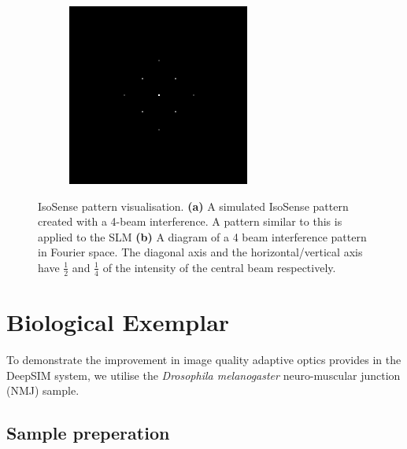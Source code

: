 \begin{figure}[h]
\begin{subfigure}{0.4\textwidth}
		\includegraphics[width=1\linewidth, scale=0.5]{./images/isosense_visualisation_ft.png}
		\caption{}
		\label{fig:isosense_visualisation_ft}
	\end{subfigure}
	\caption[IsoSense pattern visualisation.]{IsoSense pattern visualisation. \textbf{(a)} A simulated IsoSense pattern created with a 4-beam interference. A pattern similar to this is applied to the SLM \textbf{(b)} A diagram of a 4 beam interference pattern in Fourier space. The diagonal axis and the horizontal/vertical axis have $\frac{1}{2}$ and $\frac{1}{4}$ of the intensity of the central beam respectively.}
	\label{fig:isosense_visualisation}
\end{figure}

\section{Biological Exemplar}
\label{sec:DeepSIM_biology}

To demonstrate the improvement in image quality adaptive optics
provides in the DeepSIM system, we utilise the 
\textit{Drosophila melanogaster} neuro-muscular junction (NMJ) sample.

\subsection{Sample preperation}
\label{subsec:DeepSIM_sample_prep}

